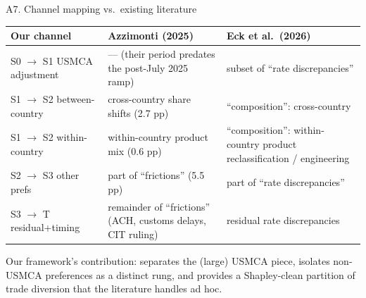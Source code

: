 \documentclass[aspectratio=169,10pt]{beamer}
\begin{document}
\begin{frame}{A7. Channel mapping vs.\ existing literature}

\small

\begin{tabular}{p{} p{} p{}}
\toprule
\textbf{Our channel} & \textbf{Azzimonti (2025)} & \textbf{Eck et al.\ (2026)} \\
\midrule
S0 $\to$ S1 USMCA adjustment & --- (their period predates the post-July 2025 ramp) & subset of ``rate discrepancies'' \\[0.4em]
S1 $\to$ S2 between-country & cross-country share shifts (2.7 pp) & ``composition'': cross-country \\[0.4em]
S1 $\to$ S2 within-country  & within-country product mix (0.6 pp) & ``composition'': within-country product reclassification / engineering \\[0.4em]
S2 $\to$ S3 other prefs     & part of ``frictions'' (5.5 pp) & part of ``rate discrepancies'' \\[0.4em]
S3 $\to$ T residual+timing  & remainder of ``frictions'' (ACH, customs delays, CIT ruling) & residual rate discrepancies \\
\bottomrule
\end{tabular}

\vspace{0.6em}

Our framework's contribution: separates the (large) USMCA piece, isolates non-USMCA preferences as a distinct rung, and provides a Shapley-clean partition of trade diversion that the literature handles ad hoc.

\end{frame}

\end{document}
